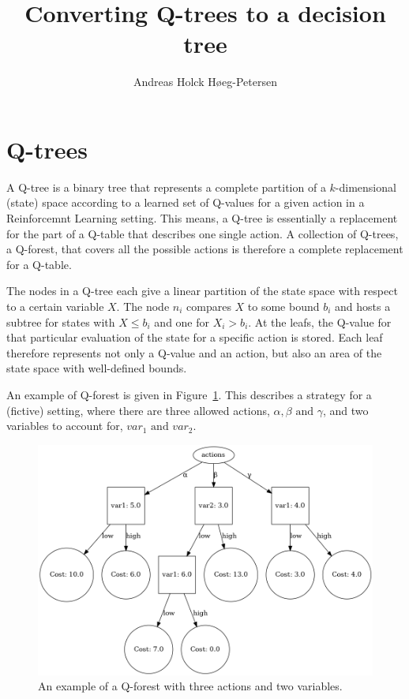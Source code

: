 \documentclass{article}
\title{Converting Q-trees to a decision tree}
\author{Andreas Holck Høeg-Petersen}
\begin{document}
\maketitle

\section{Q-trees}

A Q-tree is a binary tree that represents a complete partition of a
$k$-dimensional (state) space according to a learned set of Q-values for a given
action in a Reinforcemnt Learning setting. This means, a Q-tree is essentially a
replacement for the part of a Q-table that describes one single action. A
collection of Q-trees, a Q-forest, that covers all the possible actions is
therefore a complete replacement for a Q-table.

The nodes in a Q-tree each give a linear partition of the state space with
respect to a certain variable $X$. The node $n_i$ compares $X$ to some bound
$b_i$ and hosts a subtree for states with $X \leq b_i$ and one for $X_i > b_i $.
At the leafs, the Q-value for that particular evaluation of the state for a
specific action is stored. Each leaf therefore represents not only a Q-value and
an action, but also an area of the state space with well-defined bounds. 

An example of Q-forest is given in Figure~\ref{fig:QForest}. This describes a
strategy for a (fictive) setting, where there are three allowed actions,
$\alpha, \beta \text{ and } \gamma$, and two variables to account for, $var_1
\text{ and } var_2. $

\begin{figure}[ht]
    \centering
    \includegraphics[width=.8\textwidth]{exampleQTree}
    \caption{%
        An example of a Q-forest with three actions and two variables.
    }\label{fig:QForest}
\end{figure}
\end{document}
